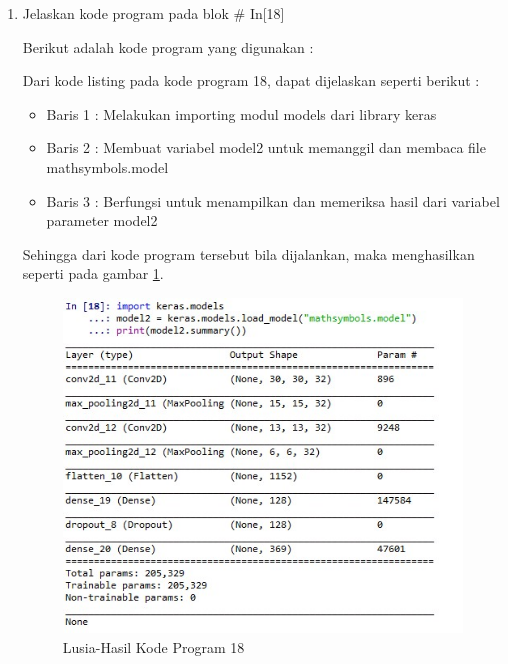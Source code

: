\begin{enumerate}
\item Jelaskan kode program pada blok \# In[18]
	\par Berikut adalah kode program yang digunakan :
	
	\par Dari kode listing pada kode program 18, dapat dijelaskan seperti berikut :
	\begin{itemize}
	\item Baris 1	: Melakukan importing modul models dari library keras
	\item Baris 2	: Membuat variabel model2 untuk memanggil dan membaca file mathsymbols.model
	\item Baris 3	: Berfungsi untuk menampilkan dan memeriksa hasil dari variabel parameter model2
	\end{itemize}
	\par Sehingga dari kode program tersebut bila dijalankan, maka menghasilkan seperti pada gambar \ref{7B18}.
		\begin{figure}[!hbtp]
		\centering
		\includegraphics[scale=0.5]{figures/w18.jpg}
		\caption{Lusia-Hasil Kode Program 18}
		\label{7B18}
		\end{figure}


\end{enumerate}
